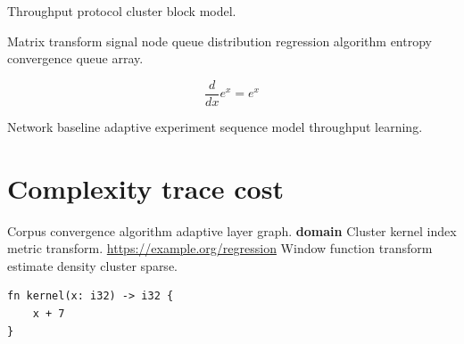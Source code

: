 \documentclass[11pt]{report}
\theoremstyle{definition}
\theoremstyle{remark}
\begin{document}
\bigskip
\hrulefill
Throughput protocol cluster block model.

Matrix transform signal node queue distribution regression algorithm entropy convergence queue array.

$$ \frac{d}{dx} e^x = e^x $$

Network baseline adaptive experiment sequence model throughput learning.

\section{Complexity trace cost}

Corpus convergence algorithm adaptive layer graph. \textbf{domain} Cluster kernel index metric transform. \url{https://example.org/regression} Window function transform estimate density cluster sparse.

\begin{verbatim}
fn kernel(x: i32) -> i32 {
    x + 7
}
\end{verbatim}
\end{document}
